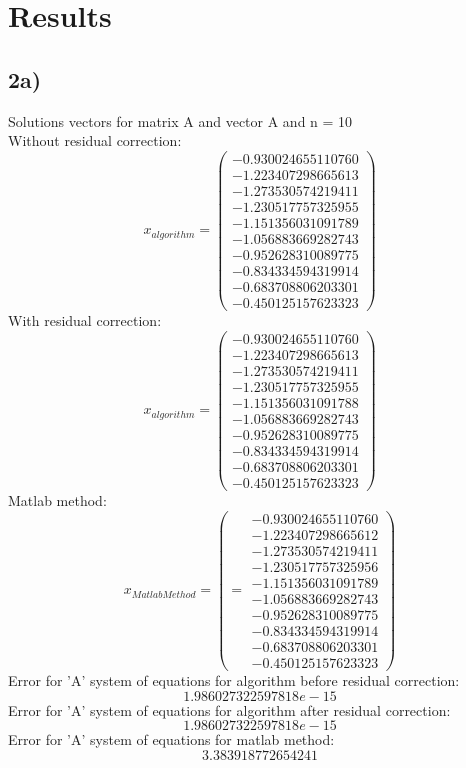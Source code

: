 \documentclass[12pt]{report}
\begin{document}
\newpage
\section{Results}
\subsection{2a)}
Solutions vectors for matrix A and vector A and n = 10 \\
Without residual correction:
\[ x_{algorithm} = \left(\begin{array}{cc}
-0.930024655110760 \\
-1.223407298665613 \\
-1.273530574219411 \\
-1.230517757325955 \\
-1.151356031091789 \\
-1.056883669282743 \\
-0.952628310089775 \\
-0.834334594319914 \\
-0.683708806203301 \\
-0.450125157623323
\end{array} \right)
\]
With residual correction:
\[ x_{algorithm} = \left(\begin{array}{cc}
-0.930024655110760 \\
-1.223407298665613 \\
-1.273530574219411 \\
-1.230517757325955 \\
-1.151356031091788 \\
-1.056883669282743 \\
-0.952628310089775 \\
-0.834334594319914 \\
-0.683708806203301 \\
-0.450125157623323
\end{array} \right)
\]
Matlab method:
\[
x_{Matlab Method} = \left(  = \begin{array}{cc}
-0.930024655110760 \\
-1.223407298665612 \\
-1.273530574219411 \\
-1.230517757325956 \\
-1.151356031091789 \\
-1.056883669282743 \\
-0.952628310089775 \\
-0.834334594319914 \\
-0.683708806203301 \\
-0.450125157623323
\end{array} \right)
\]
Error for 'A' system of equations for algorithm before residual correction: \[ 1.986027322597818e-15 \]
Error for 'A' system of equations for algorithm after residual correction: \[ 1.986027322597818e-15 \]
Error for 'A' system of equations for matlab method: \[ 3.383918772654241 \]
\newpage
\end{document}
